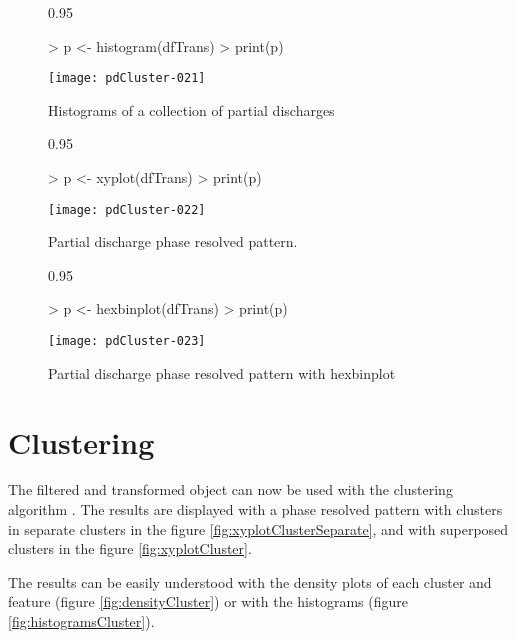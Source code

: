 \documentclass{article}
\renewenvironment{Schunk}{\begin{center}
    \scriptsize
    \begin{boxedminipage}{0.95\textwidth}}{
    \end{boxedminipage}\end{center}}
\begin{document}
\begin{figure}
  \centering
\begin{Schunk}
\begin{Sinput}
> p <- histogram(dfTrans)
> print(p)
\end{Sinput}
\end{Schunk}
\texttt{[image: pdCluster-021]}
  \caption{Histograms of a collection of partial discharges}
  \label{fig:histograms}
\end{figure}

\begin{figure}
  \centering
\begin{Schunk}
\begin{Sinput}
> p <- xyplot(dfTrans)
> print(p)
\end{Sinput}
\end{Schunk}
\texttt{[image: pdCluster-022]}
  \caption{Partial discharge phase resolved pattern.}
  \label{fig:xyplot}
\end{figure}
 

\begin{figure}
  \centering
\begin{Schunk}
\begin{Sinput}
> p <- hexbinplot(dfTrans)
> print(p)
\end{Sinput}
\end{Schunk}
\texttt{[image: pdCluster-023]}
  \caption{Partial discharge phase resolved pattern with hexbinplot }
  \label{fig:hexbinplot}
\end{figure}



\section{Clustering}
\label{sec:clustering}

The filtered and transformed object can now be used with the
clustering algorithm \cite{Struyf.Hubert.ea1997}. The results are displayed with a phase resolved
pattern with clusters in separate clusters in the figure
\ref{fig:xyplotClusterSeparate}, and with superposed clusters in the
figure \ref{fig:xyplotCluster}.

The results can be easily understood with the density plots of each
cluster and feature (figure \ref{fig:densityCluster}) or with the
histograms (figure \ref{fig:histogramsCluster}).
\end{document}
